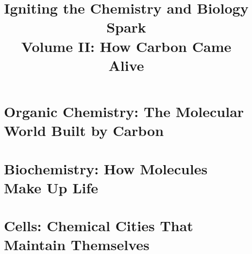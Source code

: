 \documentclass[12pt,openany,fontset=none,UTF8,scheme=chinese]{ctexbook}
\title{Igniting the Chemistry and Biology Spark\\Volume II: How Carbon Came Alive}
\author{}
\date{}
\begin{document}
\frontmatter
\maketitle
\tableofcontents

\mainmatter
\setcounter{part}{4}
\setcounter{chapter}{35}

\part{Organic Chemistry: The Molecular World Built by Carbon}










\part{Biochemistry: How Molecules Make Up Life}












\part{Cells: Chemical Cities That Maintain Themselves}








\backmatter
\end{document}
